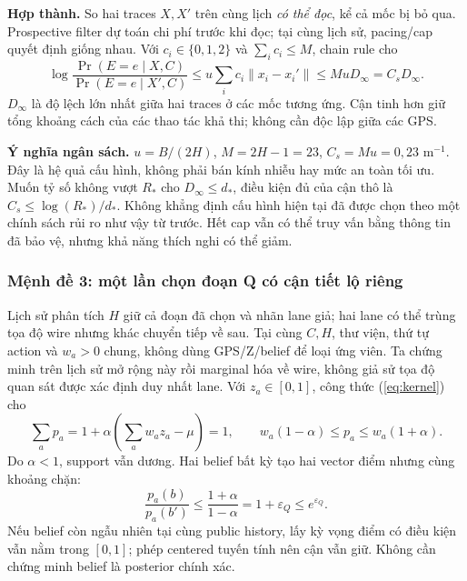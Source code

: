 \textbf{Hợp thành.} So hai traces $X,X'$ trên cùng lịch \emph{có thể đọc}, kể cả mốc bị bỏ qua.
Prospective filter dự toán chi phí trước khi đọc; tại cùng lịch sử, pacing/cap quyết định giống nhau.
Với $c_i\in\{0,1,2\}$ và $\sum_ic_i\le M$, chain rule cho
\begin{equation}
\log\frac{\Pr(E=e\mid X,C)}{\Pr(E=e\mid X',C)}
\le u\sum_ic_i\|x_i-x_i'\|\le MuD_\infty=C_sD_\infty.
\label{eq:geosession}
\end{equation}
$D_\infty$ là độ lệch lớn nhất giữa hai traces ở các mốc tương ứng. Cận tinh hơn giữ tổng khoảng cách
của các thao tác khả thi; không cần độc lập giữa các GPS.

\textbf{Ý nghĩa ngân sách.} $u=B/(2H)$, $M=2H-1=23$, $C_s=Mu=0{,}23$ m$^{-1}$.
Đây là hệ quả cấu hình, không phải bán kính nhiễu hay mức an toàn tối ưu. Muốn tỷ số không vượt $R_*$
cho $D_\infty\le d_*$, điều kiện đủ của cận thô là $C_s\le\log(R_*)/d_*$.
Không khẳng định cấu hình hiện tại đã được chọn theo một chính sách rủi ro như vậy từ trước.
Hết cap vẫn có thể truy vấn bằng thông tin đã bảo vệ, nhưng khả năng thích nghi có thể giảm.


\clearpage
\subsubsection{Mệnh đề 3: một lần chọn đoạn Q có cận tiết lộ riêng}
Lịch sử phân tích $H$ giữ cả đoạn đã chọn và nhãn lane giả; hai lane có thể trùng tọa độ wire nhưng
khác chuyển tiếp về sau. Tại cùng $C,H$, thư viện, thứ tự action và $w_a>0$ chung, không dùng GPS/Z/belief
để loại ứng viên. Ta chứng minh trên lịch sử mở rộng này rồi marginal hóa về wire, không giả sử tọa độ
quan sát được xác định duy nhất lane. Với $z_a\in[0,1]$, công thức (\ref{eq:kernel}) cho
\begin{equation}
\sum_ap_a=1+\alpha\left(\sum_aw_az_a-\mu\right)=1,\qquad
w_a(1-\alpha)\le p_a\le w_a(1+\alpha).
\label{eq:normalization}
\end{equation}
Do $\alpha<1$, support vẫn dương. Hai belief bất kỳ tạo hai vector điểm nhưng cùng khoảng chặn:
\begin{equation}
\boxed{\frac{p_a(b)}{p_a(b')}\le\frac{1+\alpha}{1-\alpha}=1+\varepsilon_Q\le e^{\varepsilon_Q}.}
\label{eq:qbound}
\end{equation}
Nếu belief còn ngẫu nhiên tại cùng public history, lấy kỳ vọng điểm có điều kiện vẫn nằm trong $[0,1]$;
phép centered tuyến tính nên cận vẫn giữ. Không cần chứng minh belief là posterior chính xác.

